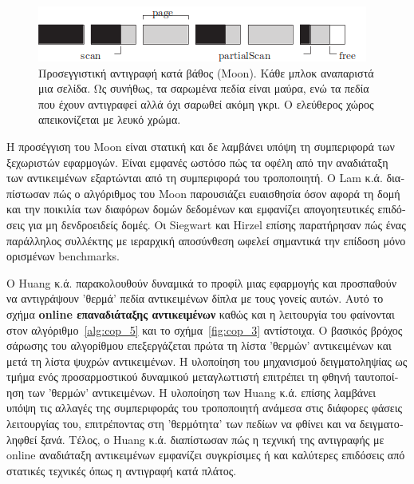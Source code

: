 \begin{greek}
\begin{figure}[H]
  \centering
  \includegraphics{figures/cop_4}
  \caption[Προσεγγιστική αντιγραφή κατά βάθος (Moon).]
   {Προσεγγιστική αντιγραφή κατά βάθος (Moon). Κάθε μπλοκ αναπαριστά
    μια σελίδα. Ως συνήθως, τα σαρωμένα πεδία είναι μαύρα, ενώ
    τα πεδία που έχουν αντιγραφεί αλλά όχι σαρωθεί ακόμη γκρι.
    Ο ελεύθερος χώρος απεικονίζεται με λευκό χρώμα.}
  \label{fig:cop_4}
\end{figure}

Η προσέγγιση του Moon είναι στατική και δε λαμβάνει υπόψη τη
συμπεριφορά των ξεχωριστών εφαρμογών. Είναι εμφανές ωστόσο πώς
τα οφέλη από την αναδιάταξη των αντικειμένων εξαρτώνται από τη
συμπεριφορά του τροποποιητή. Ο Lam κ.ά. \cite{DBLP:conf/iwmm/LamWM92}
διαπίστωσαν πώς ο αλγόριθμος του Moon παρουσιάζει ευαισθησία
όσον αφορά τη δομή και την ποικιλία των διαφόρων δομών δεδομένων
και εμφανίζει απογοητευτικές επιδόσεις για μη δενδροειδείς
δομές. Οι Siegwart και Hirzel \cite{DBLP:conf/iwmm/SiegwartH06}
επίσης παρατήρησαν πώς ένας παράλληλος συλλέκτης με ιεραρχική
αποσύνθεση ωφελεί σημαντικά την επίδοση μόνο ορισμένων benchmarks.

O Huang κ.ά. \cite{DBLP:conf/oopsla/HuangBMMWC04} παρακολουθούν
δυναμικά το προφίλ μιας εφαρμογής και προσπαθούν να αντιγράψουν
'θερμά' πεδία αντικειμένων δίπλα με τους γονείς αυτών. Αυτό το
σχήμα \textbf{online επαναδιάταξης αντικειμένων} καθώς και η
λειτουργία του φαίνονται στον αλγόριθμο~\ref{alg:cop_5} και το
σχήμα~\ref{fig:cop_3} αντίστοιχα. Ο βασικός βρόχος σάρωσης του
αλγορίθμου επεξεργάζεται πρώτα τη λίστα 'θερμών' αντικειμένων
και μετά τη λίστα ψυχρών αντικειμένων. Η υλοποίηση του μηχανισμού
δειγματοληψίας ως τμήμα ενός προσαρμοστικού δυναμικού μεταγλωττιστή
επιτρέπει τη φθηνή ταυτοποίηση των 'θερμών' αντικειμένων. Η υλοποίηση
των Huang κ.ά. επίσης λαμβάνει υπόψη τις αλλαγές της συμπεριφοράς
του τροποποιητή ανάμεσα στις διάφορες φάσεις λειτουργίας του,
επιτρέποντας στη 'θερμότητα' των πεδίων να φθίνει και να δειγματοληφθεί
ξανά. Τέλος, ο Huang κ.ά. διαπίστωσαν πώς η τεχνική της αντιγραφής
με online αναδιάταξη αντικειμένων εμφανίζει συγκρίσιμες ή και
καλύτερες επιδόσεις από στατικές τεχνικές όπως η αντιγραφή κατά
πλάτος.


\end{greek}
